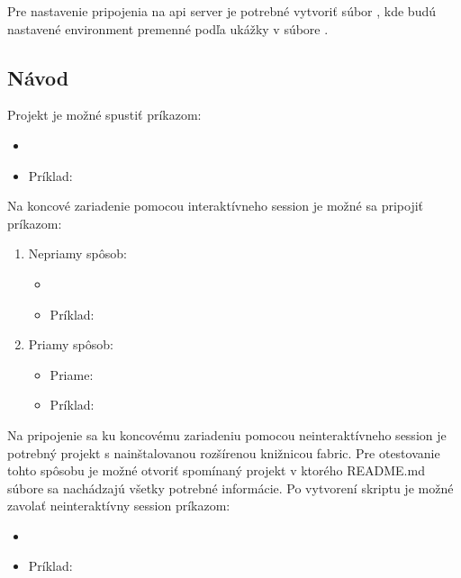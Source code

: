 Pre nastavenie pripojenia na api server je potrebné vytvoriť súbor , kde budú nastavené environment
premenné podľa ukážky v súbore .

\subsection{Návod}

Projekt je možné spustiť príkazom:
\begin{itemize}
\item {}
\item Príklad: 
\end{itemize}

\newpage

Na koncové zariadenie pomocou interaktívneho session je možné sa pripojiť príkazom:
\begin{enumerate}
    \item Nepriamy spôsob:
    \begin{itemize}
        \item {}
        \item Príklad: 
    \end{itemize}
    \item Priamy spôsob:
    \begin{itemize}
        \item Priame: 
        \item Príklad: 
    \end{itemize}
\end{enumerate}

Na pripojenie sa ku koncovému zariadeniu pomocou neinteraktívneho session je potrebný projekt s nainštalovanou rozšírenou
knižnicou fabric.
Pre otestovanie tohto spôsobu je možné otvoriť spomínaný  projekt v ktorého README.md súbore
sa nachádzajú všetky potrebné informácie.
Po vytvorení skriptu je možné zavolať neinteraktívny session príkazom:

\begin{itemize}
\item {}
\item Príklad: 
\end{itemize}
